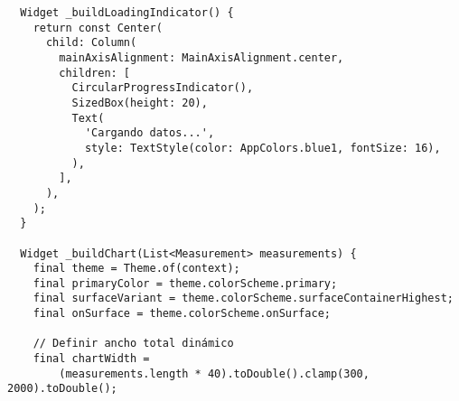 \begin{verbatim}
  Widget _buildLoadingIndicator() {
    return const Center(
      child: Column(
        mainAxisAlignment: MainAxisAlignment.center,
        children: [
          CircularProgressIndicator(),
          SizedBox(height: 20),
          Text(
            'Cargando datos...',
            style: TextStyle(color: AppColors.blue1, fontSize: 16),
          ),
        ],
      ),
    );
  }

  Widget _buildChart(List<Measurement> measurements) {
    final theme = Theme.of(context);
    final primaryColor = theme.colorScheme.primary;
    final surfaceVariant = theme.colorScheme.surfaceContainerHighest;
    final onSurface = theme.colorScheme.onSurface;

    // Definir ancho total dinámico
    final chartWidth =
        (measurements.length * 40).toDouble().clamp(300, 2000).toDouble();


\end{verbatim}

